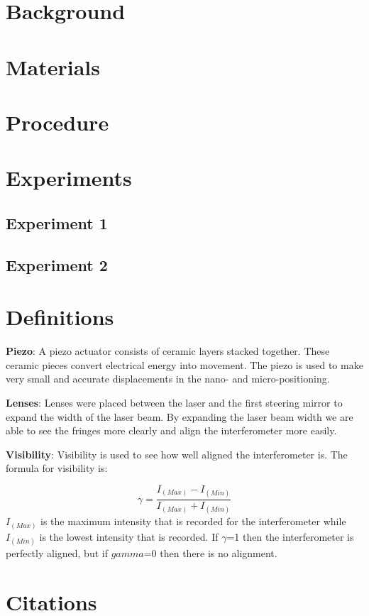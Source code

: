 \documentclass[twocolumn]{article}
\begin{document}
  


 
 \tableofcontents



\section{Background}  

\section{Materials}
		
\section{Procedure}
		
\section{Experiments}
	\subsection{Experiment 1}
	\subsection{Experiment 2}
\appendix
\section{Definitions}

\textbf{Piezo}:
    A piezo actuator consists of ceramic layers stacked together. These ceramic pieces convert electrical energy into movement. The piezo is used to make very small and accurate displacements in the nano- and micro-positioning.

\textbf{Lenses}:
    Lenses were placed between the laser and the first steering mirror to expand the width of the laser beam. By expanding the laser beam width we are able to see the fringes more clearly and align the interferometer more easily.
    
%
\textbf{Visibility}:
    Visibility is used to see how well aligned the interferometer is. The formula for visibility is:

     \begin{equation}\label{eqn:Visibility}  
        \gamma= \frac{I_(Max) - I_(Min)}{I_(Max) + I_(Min)}
     \end{equation}    
%
$I_(Max)$ is the maximum intensity that is recorded for the interferometer while $I_(Min)$ is the lowest intensity that is recorded.  If $\gamma$=1 then the interferometer is perfectly aligned, but if $gamma$=0 then there is no alignment. 

\section{Citations}

 
\end{document}
